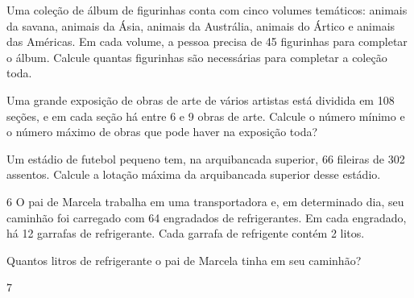 \begin{escolha}
\item Uma coleção de álbum de figurinhas conta com cinco volumes temáticos: animais da savana, animais da Ásia, animais da Austrália, animais do Ártico e animais das Américas. Em cada volume, a pessoa precisa de 45 figurinhas para completar o álbum. Calcule quantas figurinhas são necessárias para completar a coleção toda.


\item Uma grande exposição de obras de arte de vários artistas está dividida em 108 seções, e em cada seção há entre 6 e 9 obras de arte. Calcule o número mínimo e o número máximo de obras que pode haver na exposição toda?


\item Um estádio de futebol pequeno tem, na arquibancada superior, 66 fileiras de 302 assentos. Calcule a lotação máxima da arquibancada superior desse estádio.

\end{escolha}

\num{6} O pai de Marcela trabalha em uma transportadora e, em determinado
dia, seu caminhão foi carregado com 64 engradados de refrigerantes.
Em cada engradado, há 12 garrafas de refrigerante. Cada garrafa de refrigente
contém 2 litos.

\pagebreak
Quantos litros de refrigerante o pai de Marcela tinha em seu caminhão?

\begin{mdframed}[linewidth=2pt,linecolor=salmao,roundcorner=2pt]
\vspace{2cm}
\end{mdframed}

\num{7}

